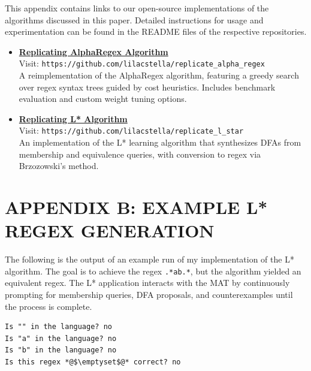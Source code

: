 \indent\indent This appendix contains links to our open-source implementations of the algorithms discussed in this paper. Detailed instructions for usage and experimentation can be found in the README files of the respective repositories.

\begin{itemize}
	\item \href{https://github.com/lilacstella/replicate\_alpha\_regex}{\textbf{Replicating AlphaRegex Algorithm}} \\
	Visit: \texttt{https://github.com/lilacstella/replicate\_alpha\_regex} \\
	A reimplementation of the AlphaRegex algorithm, featuring a greedy search over regex syntax trees guided by cost heuristics. Includes benchmark evaluation and custom weight tuning options.
	
	\item \href{https://github.com/lilacstella/replicate\_l\_star}{\textbf{Replicating L* Algorithm}} \\
	Visit: \texttt{https://github.com/lilacstella/replicate\_l\_star} \\
	An implementation of the L* learning algorithm that synthesizes DFAs from membership and equivalence queries, with conversion to regex via Brzozowski's method.
\end{itemize}



\chapter*{\large\bf APPENDIX B: EXAMPLE L* REGEX GENERATION}



\renewcommand{\thefigure}{B.\arabic{figure}}
\setcounter{figure}{0}

\indent\indent The following is the output of an example run of my implementation of the L* algorithm. The goal is to achieve the regex \texttt{.*ab.*}, but the algorithm yielded an equivalent regex. The L* application interacts with the MAT by continuously prompting for membership queries, DFA proposals, and counterexamples until the process is complete.

\begin{lstlisting}
Is "" in the language? no
Is "a" in the language? no
Is "b" in the language? no
Is this regex *@$\emptyset$@* correct? no
\end{lstlisting}

